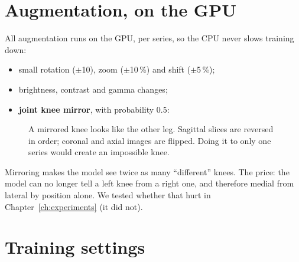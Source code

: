 \section{Augmentation, on the GPU}

All augmentation runs on the GPU, per series, so the CPU never slows training down:
\begin{itemize}
\item small rotation ($\pm$10\textdegree), zoom ($\pm$10\,\%) and shift ($\pm$5\,\%);
\item brightness, contrast and gamma changes;
\item \textbf{joint knee mirror}, with probability 0.5:
\end{itemize}

\begin{figure}[H]
\centering
{}
\caption{A mirrored knee looks like the other leg. Sagittal slices are reversed in order; coronal and axial images
are flipped. Doing it to only one series would create an impossible knee.}
\label{fig:mirror}
\end{figure}

\begin{why}
Mirroring makes the model see twice as many ``different'' knees. The price: the model can no longer tell a left
knee from a right one, and therefore medial from lateral by position alone. We tested whether that hurt in
Chapter~\ref{ch:experiments} (it did not).
\end{why}

\section{Training settings}

